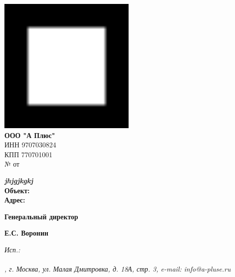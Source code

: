 \documentclass[a4paper,12pt]{letter}
\begin{document}
\noindent
\begin{minipage}[t]{0.5\textwidth}
    \vspace{0pt} %
    \includegraphics[width=0.5\textwidth]{A.png} \\ %
    \textbf{ООО "А Плюс"} \\
    ИНН 9707030824 \\
    КПП 770701001 \\
    № \textbf{  } от \textbf{  } \\
\end{minipage}%

\begin{minipage}[t]{0.5\textwidth}
    \textit{\textbf{ jhjgjkgkj }} \\
    \textbf{Объект:}  \\
    \textbf{Адрес:} 
\end{minipage}%
\begin{minipage}[t]{0.5\textwidth}
    \raggedleft
    \bfseries
    
\end{minipage}

\vspace{1cm}

\begin{center}
    \textbf{  }
\end{center}


\vspace{0.5cm}



\vspace{1cm}


\begin{minipage}[t]{0.4\textwidth}
    \textbf{Генеральный директор}
\end{minipage}%
\begin{minipage}[t]{0.2\textwidth}
    \centering
    \underline{\hspace{5cm}}
\end{minipage}%
\begin{minipage}[t]{0.4\textwidth}
    \raggedleft
    \textbf{Е.С. Воронин}
\end{minipage}


\vfill

\noindent
\itshape
Исп.:  \\
 \\


\noindent\makebox[\linewidth]{\rule{1\paperwidth}{0.4pt}}
\noindent
\centering
\fontsize{9}{10}, г. Москва, ул. Малая Дмитровка, д. 18А, стр. 3, e-mail: info@a-pluse.ru
\end{document}
